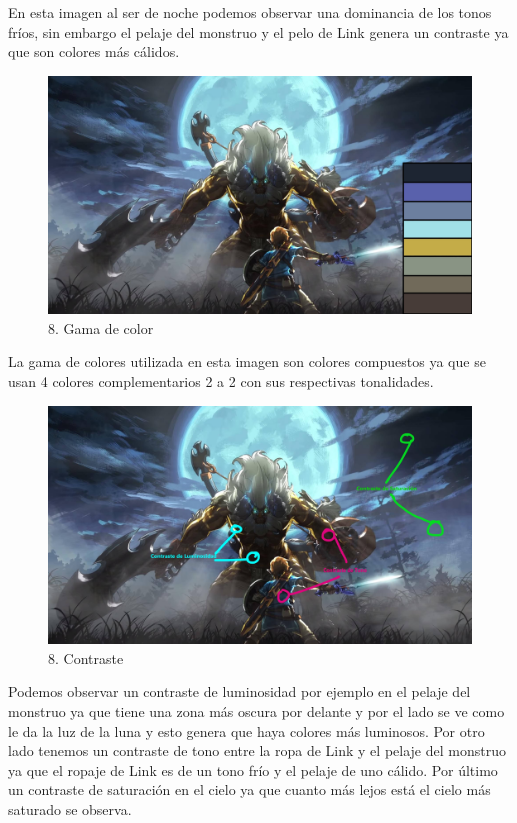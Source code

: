 \documentclass[12pt]{article}
\begin{document}
En esta imagen al ser de noche podemos observar una dominancia de los tonos fríos, sin embargo el pelaje del monstruo y el pelo de Link genera un contraste ya que son colores más cálidos.

\begin{figure}[H]
      \centering
      \includegraphics[scale=0.25]{images/Raúl/Sección 8/Imagen 8 colores.jpg}
      \caption{\small 8. Gama de color}
    \end{figure}

 La gama de colores utilizada en esta imagen son colores compuestos ya que se usan 4 colores complementarios 2 a 2 con sus respectivas tonalidades.

\begin{figure}[H]
      \centering
      \includegraphics[scale=0.25]{images/Raúl/Sección 8/Imagen 8 contraste.jpg}
      \caption{\small 8. Contraste}
    \end{figure}

Podemos observar un contraste de luminosidad por ejemplo en el pelaje del monstruo ya que tiene una zona más oscura por delante y por el lado se ve como le da la luz de la luna y esto genera que haya colores más luminosos. Por otro lado tenemos un contraste de tono entre la ropa de Link y el pelaje del monstruo ya que el ropaje de Link es de un tono frío y el pelaje de uno cálido. Por último un contraste de saturación en el cielo ya que cuanto más lejos está el cielo más saturado se observa.
\end{document}
